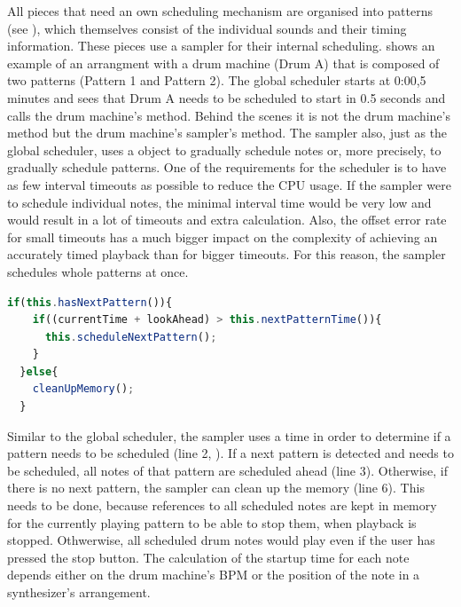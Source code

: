 All pieces that need an own scheduling mechanism are organised into patterns (see ), which themselves consist of the individual sounds and their timing information. These pieces use a sampler for their internal scheduling.  shows an example of an arrangment with a drum machine (Drum A) that is composed of two patterns (Pattern 1 and Pattern 2). The global scheduler starts at 0:00,5 minutes and sees that Drum A needs to be scheduled to start in 0.5 seconds and calls the drum machine's  method. Behind the scenes it is not the drum machine's method but the drum machine's sampler's  method. The sampler also, just as the global scheduler, uses a  object to gradually schedule notes or, more precisely, to gradually schedule patterns. One of the requirements for the scheduler is to have as few interval timeouts as possible to reduce the CPU usage. If the sampler were to schedule individual notes, the minimal interval time would be very low and would result in a lot of timeouts and extra calculation. Also, the offset error rate for small timeouts has a much bigger impact on the complexity of achieving an accurately timed playback than for bigger timeouts. For this reason, the sampler schedules whole patterns at once.

\begin{lstlisting}[language=JavaScript, caption=Scheduling patterns (sampler), label=lst:scheduling-patterns]
  if(this.hasNextPattern()){
    if((currentTime + lookAhead) > this.nextPatternTime()){
      this.scheduleNextPattern();
    }
  }else{
    cleanUpMemory();
  }
\end{lstlisting}

Similar to the global scheduler, the sampler uses a  time in order to determine if a pattern needs to be scheduled (line 2, ). If a next pattern is detected and needs to be scheduled, all notes of that pattern are scheduled ahead (line 3). Otherwise, if there is no next pattern, the sampler can clean up the memory (line 6). This needs to be done, because references to all scheduled notes are kept in memory for the currently playing pattern to be able to stop them, when playback is stopped. Othwerwise, all scheduled drum notes would play even if the user has pressed the stop button. The calculation of the startup time for each note depends either on the drum machine's BPM or the position of the note in a synthesizer's arrangement.


